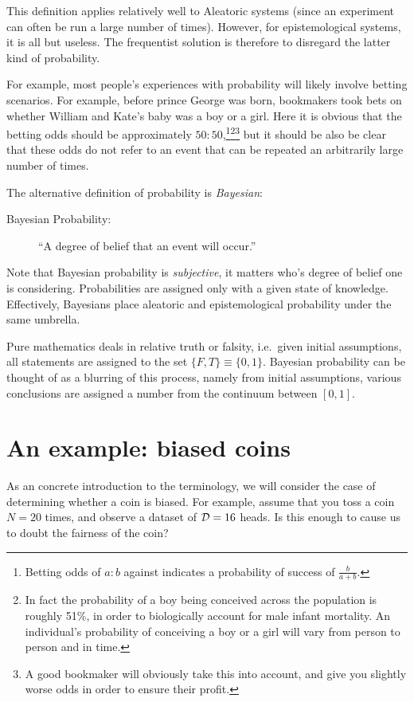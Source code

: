 This definition applies relatively well to Aleatoric systems (since an experiment can often be run a large number of times). However, for epistemological systems, it is all but useless. The frequentist solution is therefore to disregard the latter kind of probability.

For example, most people's experiences with probability will likely involve betting scenarios. For example, before prince George was born, bookmakers took bets on whether William and Kate's baby was a boy or a girl. Here it is obvious that the betting odds should be approximately $50:50$,\footnote{Betting odds of $a:b$ against indicates a probability of success of $\frac{b}{a+b}$.}\footnote{In fact the probability of a boy being conceived across the population is roughly 51\%, in order to biologically account for male infant mortality. An individual's probability of conceiving a boy or a girl will vary from person to person and in time.}\footnote{A good bookmaker will obviously take this into account, and give you slightly worse odds in order to ensure their profit.} but it should be also be clear that these odds do not refer to an event that can be repeated an arbitrarily large number of times.

The alternative definition of probability is {\em Bayesian\/}:
\begin{description}
  \item[Bayesian Probability:] ``A degree of belief that an event will occur.'' 
\end{description}
Note that Bayesian probability is {\em subjective}, it matters who's degree of belief one is considering. Probabilities are assigned only with a given state of knowledge. Effectively, Bayesians place aleatoric and epistemological probability under the same umbrella. 

Pure mathematics deals in relative truth or falsity, i.e.\ given initial assumptions, all statements are assigned to the set $\{F,T\}\equiv\{0,1\}$. Bayesian probability can be thought of as a blurring of this process, namely from initial assumptions, various conclusions are assigned a number from the continuum between $[0,1]$.

\section{An example: biased coins}
As an concrete introduction to the terminology, we will consider the case of determining whether a coin is biased.
For example, assume that you toss a coin $N=20$ times, and observe a dataset of $\mathcal{D} = 16$ heads. Is this enough to cause us to doubt the fairness of the coin?

